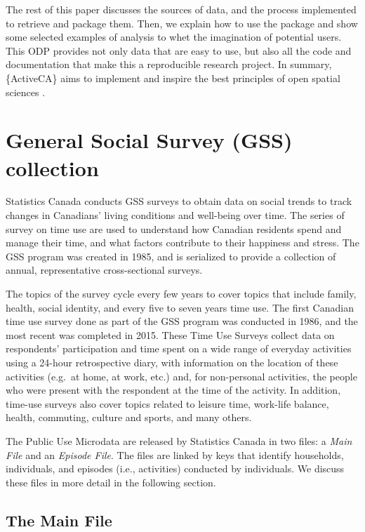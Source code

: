 \documentclass[Royal,times,sageh]{sagej}
\begin{document}
The rest of this paper discusses the sources of data, and the process
implemented to retrieve and package them. Then, we explain how to use
the package and show some selected examples of analysis to whet the
imagination of potential users. This ODP provides not only data that are
easy to use, but also all the code and documentation that make this a
reproducible research project. In summary, \{ActiveCA\} aims to
implement and inspire the best principles of open spatial sciences
\citep{paez_open_2021, brunsdon_opening_2021}.

\section{General Social Survey (GSS)
collection}\label{general-social-survey-gss-collection}

Statistics Canada \citeyearpar{statisticscanada2024} conducts GSS
surveys to obtain data on social trends to track changes in Canadians'
living conditions and well-being over time. The series of survey on time
use are used to understand how Canadian residents spend and manage their
time, and what factors contribute to their happiness and stress. The GSS
program was created in 1985, and is serialized to provide a collection
of annual, representative cross-sectional surveys.

The topics of the survey cycle every few years to cover topics that
include family, health, social identity, and every five to seven years
time use. The first Canadian time use survey done as part of the GSS
program was conducted in 1986, and the most recent was completed in
2015. These Time Use Surveys \citep{statisticscanada2022} collect data
on respondents' participation and time spent on a wide range of everyday
activities using a 24-hour retrospective diary, with information on the
location of these activities (e.g.~at home, at work, etc.) and, for
non-personal activities, the people who were present with the respondent
at the time of the activity. In addition, time-use surveys also cover
topics related to leisure time, work-life balance, health, commuting,
culture and sports, and many others.

The Public Use Microdata are released by Statistics Canada in two files:
a \emph{Main File} and an \emph{Episode File}. The files are linked by
keys that identify households, individuals, and episodes (i.e.,
activities) conducted by individuals. We discuss these files in more
detail in the following section.

\subsection{The Main File}\label{the-main-file}
\end{document}
